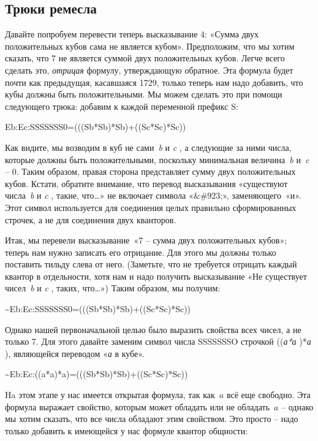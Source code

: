 \documentclass[../main.tex]{subfiles}
\begin{document}
\subsection{Трюки ремесла}

Давайте попробуем перевести теперь высказывание 4: «Сумма двух положительных кубов сама не является кубом». Предположим, что мы хотим сказать, что 7 не является суммой двух положительных кубов. Легче всего сделать это, \emph{отрицая} формулу, утверждающую обратное. Эта формула будет почти как предыдущая, касавшаяся 1729, только теперь нам надо добавить, что кубы должны быть положительными. Мы можем сделать это при помощи следующего трюка: добавим к каждой переменной префикс S:

Eb:Ec:SSSSSSS0=(((Sb*Sb)*Sb)+((Sc*Sc)*Sc))

Как видите, мы возводим в куб не сами~\emph{b} и \emph{c} , а следующие за ними числа, которые должны быть положительными, поскольку минимальная величина~\emph{b} и~\emph{c} \--- 0. Таким образом, правая сторона представляет сумму двух положительных кубов. Кстати, обратите внимание, что перевод высказывания «существуют числа~\emph{b} и \emph{c} , такие, что\ldots» не включает символа «\&\#923;», заменяющего~«и». Этот символ используется для соединения целых правильно сформированных строчек, а не для соединения двух кванторов.

Итак, мы перевели высказывание~«7 \--- сумма двух положительных кубов»; теперь нам нужно записать его отрицание. Для этого мы должны только поставить тильду слева от него. (Заметьте, что не требуется отрицать каждый квантор в отдельности, хотя нам и надо получить высказывание «Не существует чисел~\emph{b} и \emph{c} , таких, что\ldots») Таким образом, мы получим:

\textasciitilde Eb:Ec:SSSSSSS0=(((Sb*Sb)*Sb)+((Sc*Sc)*Sc))

Однако нашей первоначальной целью было выразить свойства всех чисел, а не только 7. Для этого давайте заменим символ числа SSSSSSSO строчкой ((\emph{а*а} )*\emph{а} ), являющейся переводом «\emph{а} в кубе».

\textasciitilde Eb:Ec:((a*a)*a)=(((Sb*Sb)*Sb)+((Sc*Sc)*Sc))

Ha этом этапе у нас имеется открытая формула, так как~$a$ всё еще свободно. Эта формула выражает свойство, которым может обладать или не обладать~$a$ \--- однако мы хотим сказать, что все числа обладают этим свойством. Это просто \--- надо только добавить к имеющейся у нас формуле квантор общности:
\end{document}
